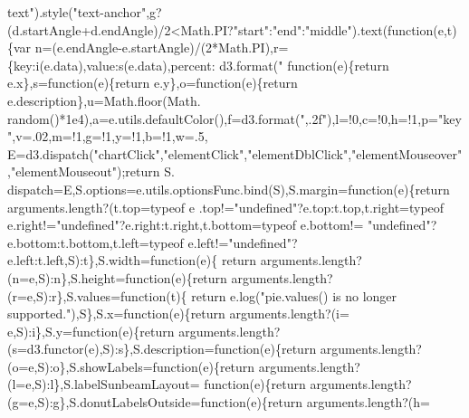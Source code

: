 \begin{DoxyCode}
{       text"}).style(\textcolor{stringliteral}{"text-anchor"},g?(d.startAngle+d.endAngle)/2<Math.PI?\textcolor{stringliteral}{"start"}:\textcolor{stringliteral}{"end"}:\textcolor{stringliteral}{"middle"}).text(\textcolor{keyword}{function}(e,t)
      \{var n=(e.endAngle-e.startAngle)/(2*Math.PI),r=\{key:i(e.data),value:s(e.data),percent:
      d3.format(\textcolor{stringliteral}{"%
      function}(e)\{\textcolor{keywordflow}{return} e.x\},s=\textcolor{keyword}{function}(e)\{\textcolor{keywordflow}{return} e.y\},o=\textcolor{keyword}{function}(e)\{\textcolor{keywordflow}{return} e.description\},u=Math.floor(Math.
      random()*1e4),a=e.utils.defaultColor(),f=d3.format(\textcolor{stringliteral}{",.2f"}),l=!0,c=!0,h=!1,p=\textcolor{stringliteral}{"key"},v=.02,m=!1,g=!1,y=!1,b=!1,w=.5,
      E=d3.dispatch(\textcolor{stringliteral}{"chartClick"},\textcolor{stringliteral}{"elementClick"},\textcolor{stringliteral}{"elementDblClick"},\textcolor{stringliteral}{"elementMouseover"},\textcolor{stringliteral}{"elementMouseout"});\textcolor{keywordflow}{return} S.
      dispatch=E,S.options=e.utils.optionsFunc.bind(S),S.margin=\textcolor{keyword}{function}(e)\{\textcolor{keywordflow}{return} arguments.length?(t.top=typeof e
      .top!=\textcolor{stringliteral}{"undefined"}?e.top:t.top,t.right=typeof e.right!=\textcolor{stringliteral}{"undefined"}?e.right:t.right,t.bottom=typeof e.bottom!=\textcolor{stringliteral}{
      "undefined"}?e.bottom:t.bottom,t.left=typeof e.left!=\textcolor{stringliteral}{"undefined"}?e.left:t.left,S):t\},S.width=\textcolor{keyword}{function}(e)\{\textcolor{keywordflow}{
      return} arguments.length?(n=e,S):n\},S.height=\textcolor{keyword}{function}(e)\{\textcolor{keywordflow}{return} arguments.length?(r=e,S):r\},S.values=\textcolor{keyword}{function}(t)\{\textcolor{keywordflow}{
      return} e.log(\textcolor{stringliteral}{"pie.values() is no longer supported."}),S\},S.x=\textcolor{keyword}{function}(e)\{\textcolor{keywordflow}{return} arguments.length?(i=
      e,S):i\},S.y=\textcolor{keyword}{function}(e)\{\textcolor{keywordflow}{return} arguments.length?(s=d3.functor(e),S):s\},S.description=\textcolor{keyword}{function}(e)\{\textcolor{keywordflow}{return} 
      arguments.length?(o=e,S):o\},S.showLabels=\textcolor{keyword}{function}(e)\{\textcolor{keywordflow}{return} arguments.length?(l=e,S):l\},S.labelSunbeamLayout=\textcolor{keyword}{
      function}(e)\{\textcolor{keywordflow}{return} arguments.length?(g=e,S):g\},S.donutLabelsOutside=\textcolor{keyword}{function}(e)\{\textcolor{keywordflow}{return} arguments.length?(h=

\end{DoxyCode}
